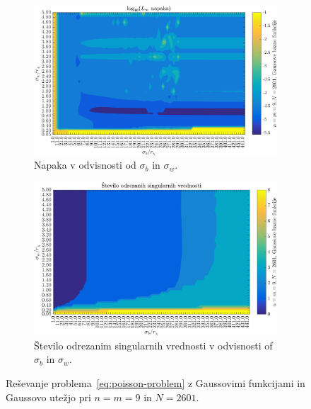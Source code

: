 \documentclass[12pt,a4paper,twoside]{article}
\theoremstyle{definition} %
\theoremstyle{plain} %
\numberwithin{equation}{section}
\begin{document}
\begin{figure}[h]
  \centering
  \begin{subfigure}[t]{0.45\textwidth}
    \includegraphics[width=\textwidth]{images/poisson_square_sigma_depedence_error.png}
    \caption{Napaka v odvisnosti od $\sigma_b$ in $\sigma_w$.}
    \label{fig:poisson-square-sigma-dep-error}
  \end{subfigure}
  \begin{subfigure}[t]{0.45\textwidth}
    \includegraphics[width=\textwidth]{images/poisson_square_sigma_depedence_cutoff.png}
    \caption{Število odrezanim singularnih vrednosti v odvisnosti of $\sigma_b$
    in $\sigma_w$.}
    \label{fig:poisson-square-sigma-dep-cutoff}
  \end{subfigure}
  \caption{Reševanje problema~\eqref{eq:poisson-problem} z Gaussovimi funkcijami
  in Gaussovo utežjo pri $n = m = 9$ in $N = 2601$.}
  \label{fig:poisson-square-sigma-dep}
\end{figure}
\end{document}

